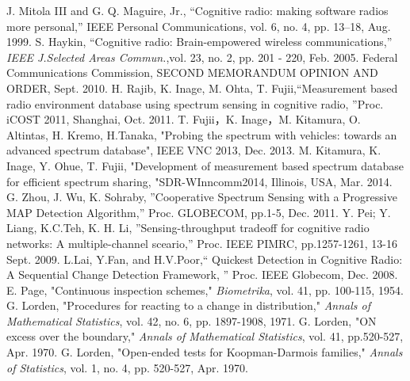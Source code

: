 \begin{thebibliography}{99}
J. Mitola III and G. Q. Maguire, Jr., ``Cognitive radio: making software radios more personal,'' IEEE Personal Communications, vol. 6, no. 4, pp. 13–18, Aug. 1999.
 S. Haykin, ``Cognitive radio: Brain-empowered wireless communications,'' {\it IEEE J.Selected Areas Commun.},vol. 23, no. 2, pp. 201 - 220, Feb. 2005.
Federal Communications Commission, SECOND MEMORANDUM OPINION AND ORDER, Sept. 2010.
H. Rajib, K. Inage, M. Ohta, T. Fujii,“Measurement based radio environment database using spectrum sensing in cognitive radio, ”Proc. iCOST 2011, Shanghai, Oct. 2011.
T. Fujii，K. Inage，M. Kitamura, O. Altintas, H. Kremo, H.Tanaka, "Probing the spectrum with vehicles: towards an advanced spectrum database", IEEE VNC 2013, Dec. 2013.
M. Kitamura, K. Inage, Y. Ohue, T. Fujii, "Development of measurement based spectrum database for efficient spectrum sharing, "SDR-WInncomm2014, Illinois, USA, Mar. 2014.
G. Zhou, J. Wu, K. Sohraby, ”Cooperative Spectrum Sensing with a Progressive MAP Detection Algorithm,” Proc. GLOBECOM, pp.1-5, Dec. 2011.
Y. Pei; Y. Liang, K.C.Teh, K. H. Li, ”Sensing-throughput tradeoff for cognitive radio networks: A multiple-channel sceario,” Proc. IEEE PIMRC, pp.1257-1261, 13-16 Sept. 2009.
L.Lai, Y.Fan, and H.V.Poor,“ Quickest Detection in Cognitive Radio: A Sequential Change Detection Framework, ” Proc. IEEE Globecom, Dec. 2008.
E. Page, "Continuous inspection schemes," {\it Biometrika}, vol. 41, pp. 100-115, 1954.
G. Lorden, "Procedures for reacting to a change in distribution," {\it Annals of Mathematical Statistics}, vol. 42, no. 6, pp. 1897-1908, 1971.  
G. Lorden, "ON excess over the boundary," {\it Annals of Mathematical Statistics}, vol. 41, pp.520-527, Apr. 1970.
G. Lorden, "Open-ended tests for Koopman-Darmois families," {\it Annals of Statistics}, vol. 1, no. 4, pp. 520-527, Apr. 1970.
\end{thebibliography}
